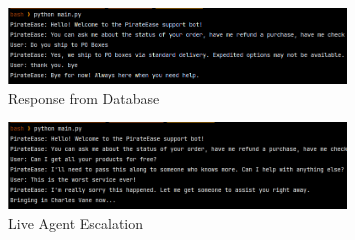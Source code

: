 \documentclass[11pt]{article}
\begin{document}
\begin{figure}[h!]
    \centering
    \includegraphics[width=0.8\textwidth]{response_from_database.png}
    \caption{Response from Database}
\end{figure}

\begin{figure}[h!]
    \centering
    \includegraphics[width=0.8\textwidth]{live_agent_escalation.png}
    \caption{Live Agent Escalation}
\end{figure}
\end{document}
